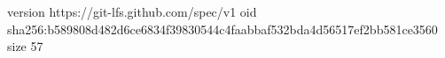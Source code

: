 version https://git-lfs.github.com/spec/v1
oid sha256:b589808d482d6ce6834f39830544c4faabbaf532bda4d56517ef2bb581ce3560
size 57
